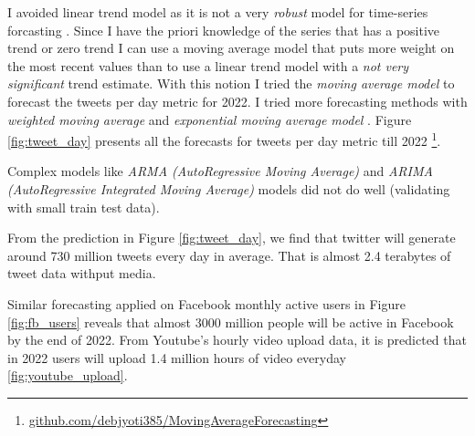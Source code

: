 I avoided linear trend model as it is not a very {\em robust} model for time-series forcasting \cite{nau2014review}. Since I have the
priori knowledge of the series that has a positive trend or zero trend I can use a moving
average model that puts more weight on the most recent values than to use a linear trend model
with a {\em not very significant} trend estimate. With this notion I tried the {\em moving average model} to forecast the tweets per day metric for 2022. I tried more forecasting methods with {\em weighted moving average} and {\em exponential moving average model }. Figure \ref{fig:tweet_day} presents all the forecasts for tweets per day metric till 2022 \footnote{\href{https://github.com/debjyoti385/MovingAverageForecasting}{github.com/debjyoti385/MovingAverageForecasting}}.

Complex models like {\em ARMA (AutoRegressive Moving Average)} and {\em ARIMA (AutoRegressive  Integrated Moving Average)} models  did not do well (validating with small train test data).

From the prediction in Figure \ref{fig:tweet_day}, we find that twitter will generate around 730 million tweets every day in average. That is almost 2.4 terabytes of tweet data withput media.

Similar forecasting applied on Facebook monthly active users in Figure \ref{fig:fb_users} reveals that almost 3000 million people will be active in Facebook by the end of 2022. From Youtube's hourly video upload data, it is predicted that in 2022 users will upload 1.4 million hours of video everyday \ref{fig:youtube_upload}.




